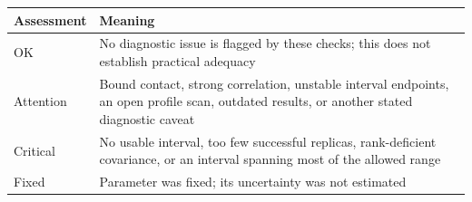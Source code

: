 \documentclass[
  10pt,
  a4paper,
  oneside]{scrreprt}
\begin{document}
\begin{longtable}[]{@{}ll@{}}
\toprule
\begin{minipage}[b]{0.47\columnwidth}\raggedright
Assessment\strut
\end{minipage} & \begin{minipage}[b]{0.47\columnwidth}\raggedright
Meaning\strut
\end{minipage}\tabularnewline
\midrule
\endhead
\begin{minipage}[t]{0.47\columnwidth}\raggedright
OK\strut
\end{minipage} & \begin{minipage}[t]{0.47\columnwidth}\raggedright
No diagnostic issue is flagged by these checks; this does not establish
practical adequacy\strut
\end{minipage}\tabularnewline
\begin{minipage}[t]{0.47\columnwidth}\raggedright
Attention\strut
\end{minipage} & \begin{minipage}[t]{0.47\columnwidth}\raggedright
Bound contact, strong correlation, unstable interval endpoints, an open
profile scan, outdated results, or another stated diagnostic
caveat\strut
\end{minipage}\tabularnewline
\begin{minipage}[t]{0.47\columnwidth}\raggedright
Critical\strut
\end{minipage} & \begin{minipage}[t]{0.47\columnwidth}\raggedright
No usable interval, too few successful replicas, rank-deficient
covariance, or an interval spanning most of the allowed range\strut
\end{minipage}\tabularnewline
\begin{minipage}[t]{0.47\columnwidth}\raggedright
Fixed\strut
\end{minipage} & \begin{minipage}[t]{0.47\columnwidth}\raggedright
Parameter was fixed; its uncertainty was not estimated\strut
\end{minipage}\tabularnewline
\bottomrule
\end{longtable}
\end{document}
